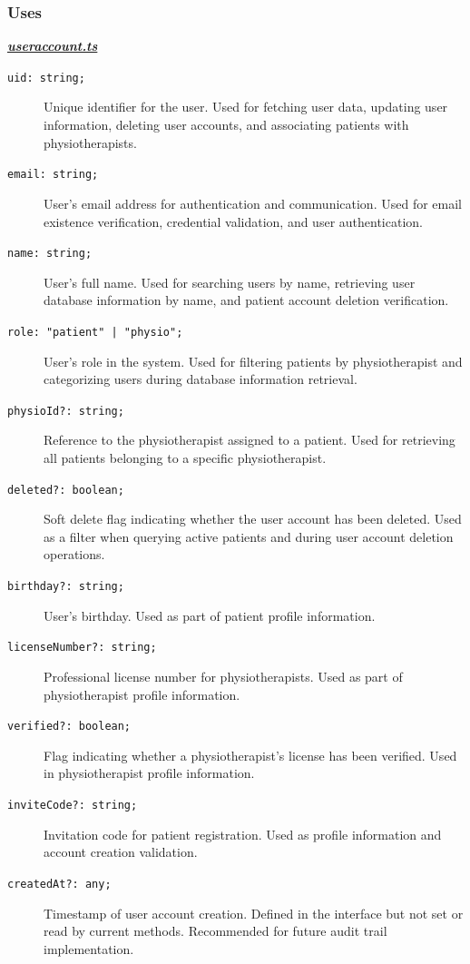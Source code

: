 \documentclass[12pt, titlepage]{article}
\begin{document}
\subsubsection{Uses}
\underline{\textbf{\textit{useraccount.ts}}}
\begin{description}
\item[\texttt{uid: string;}] 
    Unique identifier for the user. Used for fetching user data, updating user information, deleting user accounts, and associating patients with physiotherapists.

\item[\texttt{email: string;}] 
    User's email address for authentication and communication. Used for email existence verification, credential validation, and user authentication.

\item[\texttt{name: string;}] 
    User's full name. Used for searching users by name, retrieving user database information by name, and patient account deletion verification.

\item[\texttt{role: "patient" | "physio";}] 
    User's role in the system. Used for filtering patients by physiotherapist and categorizing users during database information retrieval.

\item[\texttt{physioId?: string;}] 
    Reference to the physiotherapist assigned to a patient. Used for retrieving all patients belonging to a specific physiotherapist.

\item[\texttt{deleted?: boolean;}]
    Soft delete flag indicating whether the user account has been deleted. Used as a filter when querying active patients and during user account deletion operations.

\item[\texttt{birthday?: string;}] 
    User's birthday. Used as part of patient profile information.

\item[\texttt{licenseNumber?: string;}] 
    Professional license number for physiotherapists. Used as part of physiotherapist profile information.

\item[\texttt{verified?: boolean;}] 
    Flag indicating whether a physiotherapist's license has been verified. Used in physiotherapist profile information.

\item[\texttt{inviteCode?: string;}] 
    Invitation code for patient registration. Used as profile information and account creation validation.

\item[\texttt{createdAt?: any;}]
    Timestamp of user account creation. Defined in the interface but not set or read by current methods. Recommended for future audit trail implementation.

\end{description}
\end{document}
